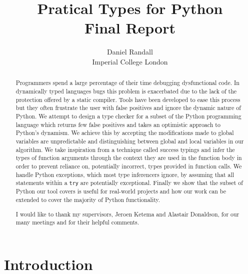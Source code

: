 \documentclass[12pt, titlepage]{article}
\title{Pratical Types for Python \\ Final Report}
\author{Daniel Randall \\ Imperial College London}
\date{}
\begin{document}
\maketitle


\begin{abstract}
Programmers spend a large percentage of their time debugging dysfunctional code. In dynamically typed languages bugs this problem is exacerbated due to the lack of the protection offered by a static compiler. Tools have been developed to ease this process but they often frustrate the user with false positives and ignore the dynamic nature of Python. We attempt to design a type checker for a subset of the Python programming language which returns few false positives and takes an optimistic approach to Python's dynamism. We achieve this by accepting the modifications made to global variables are unpredictable and distinguishing between global and local variables in our algorithm. We take inspiration from a technique called success typings and infer the types of function arguments through the context they are used in the function body in order to prevent reliance on, potentially incorrect, types provided in function calls. We handle Python exceptions, which most type inferencers ignore, by assuming that all statements within a \texttt{try} are potentially exceptional. Finally we show that the subset of Python our tool covers is useful for real-world projects and how our work can be extended to cover the majority of Python functionality.
\end{abstract}

\renewcommand{\abstractname}{Acknowledgements}
\begin{abstract}
I would like to thank my supervisors, Jeroen Ketema and Alastair Donaldson, for our many meetings and for their helpful comments.
\end{abstract}

\tableofcontents
\newpage

\section{Introduction}
\end{document}
